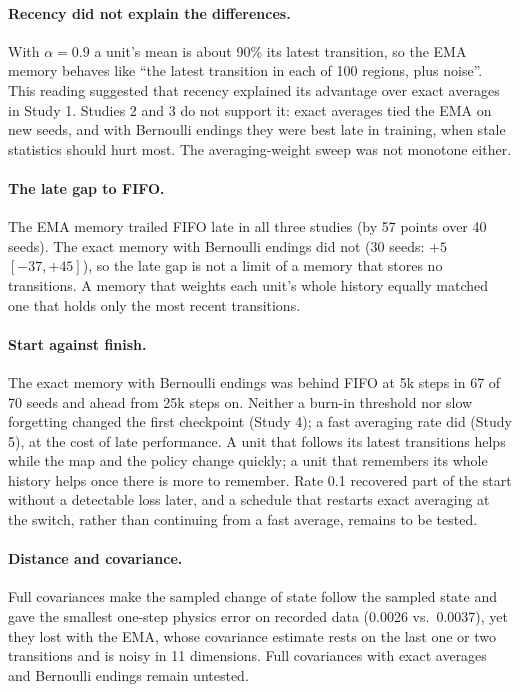 \documentclass{article}
\begin{document}
\paragraph{Recency did not explain the differences.} With $\alpha = 0.9$ a
unit's mean is about 90\% its latest transition, so the EMA memory behaves
like ``the latest transition in each of 100 regions, plus noise''. This
reading suggested that recency explained its advantage over exact averages
in Study 1. Studies 2 and 3 do not support it: exact averages tied the EMA on
new seeds, and with Bernoulli endings they were best late in training, when
stale statistics should hurt most. The averaging-weight sweep was not
monotone either.

\paragraph{The late gap to FIFO.} The EMA memory trailed FIFO late in all
three studies (by 57 points over 40 seeds). The exact memory with Bernoulli
endings did not (30 seeds: $+5$ $[-37, +45]$), so the late gap is not a limit
of a memory that stores no transitions. A memory that weights each unit's
whole history equally matched one that holds only the most recent
transitions.

\paragraph{Start against finish.} The exact memory with Bernoulli endings
was behind FIFO at 5k steps in 67 of 70 seeds and ahead from 25k steps on.
Neither a burn-in threshold nor slow forgetting changed the first checkpoint
(Study 4); a fast averaging rate did (Study 5), at the cost of late
performance. A unit that follows its latest transitions helps while the map
and the policy change quickly; a unit that remembers its whole history helps
once there is more to remember. Rate 0.1 recovered part of the start without
a detectable loss later, and a schedule that restarts exact averaging at the
switch, rather than continuing from a fast average, remains to be tested.

\paragraph{Distance and covariance.} Full covariances make the sampled change
of state follow the sampled state and gave the smallest one-step physics
error on recorded data (0.0026 vs.\ 0.0037), yet they lost with the EMA,
whose covariance estimate rests on the last one or two transitions and is
noisy in 11 dimensions. Full covariances with exact averages and Bernoulli
endings remain untested.
\end{document}
